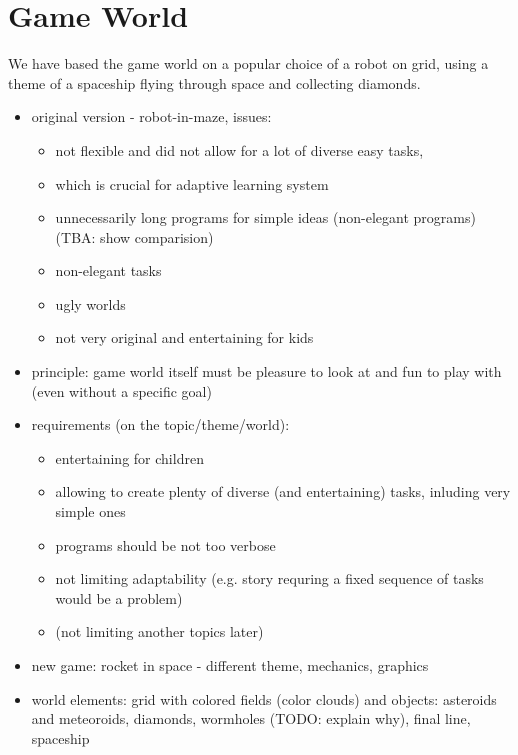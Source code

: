 

\section{Game World}  %
\label{sec:robomission.game-world}

We have based the game world on a popular choice of a robot on grid,
using a theme of a spaceship flying through space and collecting diamonds.

\begin{itemize}
\item original version - robot-in-maze, issues:
  \begin{itemize}
  \item not flexible and did not allow for a lot of diverse easy tasks,
  \item which is crucial for adaptive learning system
  \item unnecessarily long programs for simple ideas (non-elegant programs) (TBA: show comparision)
  \item non-elegant tasks
  \item ugly worlds
  \item not very original and entertaining for kids
  \end{itemize}
\item principle: game world itself must be pleasure to look at and fun to play
with (even without a specific goal) \cite{book-of-lenses}
\item requirements (on the topic/theme/world):
  \begin{itemize}
  \item entertaining for children
  \item allowing to create plenty of diverse (and entertaining) tasks, inluding very simple ones
  \item programs should be not too verbose
  \item not limiting adaptability (e.g. story requring a fixed sequence of tasks would be a problem)
  \item (not limiting another topics later)
  \end{itemize}
\item new game: rocket in space - different theme, mechanics, graphics
\item world elements: grid with colored fields (color clouds) and objects: asteroids and meteoroids, diamonds, wormholes (TODO: explain why), final line, spaceship

\end{itemize}
